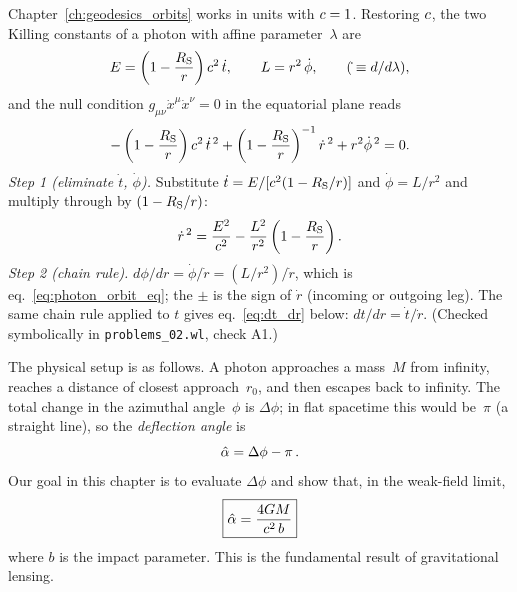 \begin{derivation}
Chapter~\ref{ch:geodesics_orbits} works in units with $c = 1$.  Restoring $c$,
the two Killing constants of a photon with affine parameter~$\lambda$ are
\[
    E = \left(1 - \frac{R_{\mathrm{S}}}{r}\right)c^2\,\dot t , \qquad
    L = r^2\,\dot\phi , \qquad (\dot{} \equiv d/d\lambda),
\]
and the null condition $g_{\mu\nu}\dot x^\mu \dot x^\nu = 0$ in the equatorial
plane reads
\[
    -\left(1 - \frac{R_{\mathrm{S}}}{r}\right)c^2\,\dot t^{\,2}
    + \left(1 - \frac{R_{\mathrm{S}}}{r}\right)^{-1}\dot r^{\,2} + r^2\dot\phi^{\,2} = 0 .
\]
\textit{Step 1 (eliminate $\dot t$, $\dot\phi$).}  Substitute
$\dot t = E/[c^2(1-R_{\mathrm{S}}/r)]$ and $\dot\phi = L/r^2$ and multiply
through by $(1-R_{\mathrm{S}}/r)$:
\[
    \dot r^{\,2} = \frac{E^2}{c^2}
    - \frac{L^2}{r^2}\left(1 - \frac{R_{\mathrm{S}}}{r}\right).
\]
\textit{Step 2 (chain rule).}  $d\phi/dr = \dot\phi/\dot r = (L/r^2)/\dot r$,
which is eq.~\eqref{eq:photon_orbit_eq}; the $\pm$ is the sign of $\dot r$
(incoming or outgoing leg).  The same chain rule applied to $t$ gives
eq.~\eqref{eq:dt_dr} below: $dt/dr = \dot t/\dot r$.
(Checked symbolically in \texttt{problems\_02.wl}, check A1.)
\end{derivation}
The physical setup is as follows.  A photon approaches a mass~$M$ from
infinity, reaches a distance of closest approach~$r_0$, and then escapes
back to infinity.  The total change in the azimuthal angle~$\phi$ is
$\Delta\phi$; in flat spacetime this would be~$\pi$ (a straight line), so
the \emph{deflection angle} is
\begin{equation}
    \hat{\alpha} = \Delta\phi - \pi \,.
    \label{eq:deflection_def}
\end{equation}
Our goal in this chapter is to evaluate $\Delta\phi$ and show that, in the
weak-field limit,
\begin{equation}
    \boxed{
    \hat{\alpha} = \frac{4G M}{c^2\, b}
    }
    \label{eq:alphahat_main}
\end{equation}
where $b$ is the impact parameter.  This is the fundamental result of
gravitational lensing.


